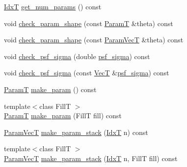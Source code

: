 \begin{DoxyCompactItemize}
\item 
\hyperlink{namespacemappel_ab17ec0f30b61ece292439d7ece81d3a8}{IdxT} \hyperlink{classmappel_1_1PointEmitterModel_a6fe8129bd24ab5c6620b3ab106b6c91a}{get\+\_\+num\+\_\+params} () const 
\item 
void \hyperlink{classmappel_1_1PointEmitterModel_a97a868e842302f670ed9f9bd49416771}{check\+\_\+param\+\_\+shape} (const \hyperlink{classmappel_1_1PointEmitterModel_a665ec6aea3aac139bb69a23c06d4b9a1}{ParamT} \&theta) const 
\item 
void \hyperlink{classmappel_1_1PointEmitterModel_a54b341a9bc0e32e2c8bbfe4ec0d8c9a1}{check\+\_\+param\+\_\+shape} (const \hyperlink{classmappel_1_1PointEmitterModel_add253b568d763f1513a810aac35de719}{Param\+VecT} \&theta) const 
\item 
void \hyperlink{classmappel_1_1PointEmitterModel_a01ce8d6358acbd2575be519dff1df89b}{check\+\_\+psf\+\_\+sigma} (double \hyperlink{classmappel_1_1Gauss1DModel_a62c6b2a5d8ab5f5596504a19daed66b2}{psf\+\_\+sigma}) const 
\item 
void \hyperlink{classmappel_1_1PointEmitterModel_a85780ca544a5ef5e0a62e74005081677}{check\+\_\+psf\+\_\+sigma} (const \hyperlink{namespacemappel_a2225ad69f358daa3f4f99282a35b9a3a}{VecT} \&\hyperlink{classmappel_1_1Gauss1DModel_a62c6b2a5d8ab5f5596504a19daed66b2}{psf\+\_\+sigma}) const 
\item 
\hyperlink{classmappel_1_1PointEmitterModel_a665ec6aea3aac139bb69a23c06d4b9a1}{ParamT} \hyperlink{classmappel_1_1PointEmitterModel_a1cd8ff64ce4132b6eaa8655696885749}{make\+\_\+param} () const 
\item 
{\footnotesize template$<$class FillT $>$ }\\\hyperlink{classmappel_1_1PointEmitterModel_a665ec6aea3aac139bb69a23c06d4b9a1}{ParamT} \hyperlink{classmappel_1_1PointEmitterModel_a5638e3df26cf84d7cf0f23112132682e}{make\+\_\+param} (FillT fill) const 
\item 
\hyperlink{classmappel_1_1PointEmitterModel_add253b568d763f1513a810aac35de719}{Param\+VecT} \hyperlink{classmappel_1_1PointEmitterModel_a6c7edc7f2549058df66472cd7647cf9b}{make\+\_\+param\+\_\+stack} (\hyperlink{namespacemappel_ab17ec0f30b61ece292439d7ece81d3a8}{IdxT} n) const 
\item 
{\footnotesize template$<$class FillT $>$ }\\\hyperlink{classmappel_1_1PointEmitterModel_add253b568d763f1513a810aac35de719}{Param\+VecT} \hyperlink{classmappel_1_1PointEmitterModel_abab975b04e09e6336a930b6d8fd8c267}{make\+\_\+param\+\_\+stack} (\hyperlink{namespacemappel_ab17ec0f30b61ece292439d7ece81d3a8}{IdxT} n, FillT fill) const 

\end{DoxyCompactItemize}
